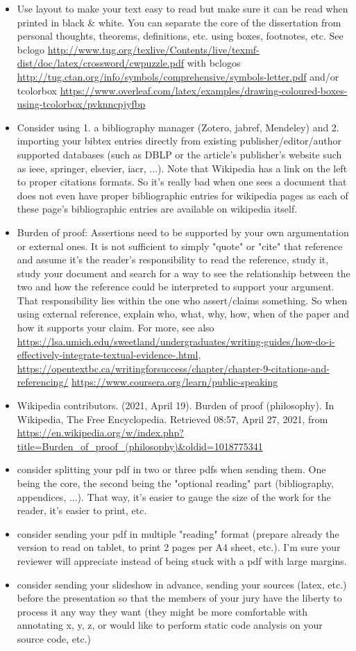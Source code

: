 \begin{itemize}
    \item Use layout to make your text easy to read but make sure it can be read when printed in black \& white. You can separate the core of the dissertation from personal thoughts, theorems, definitions, etc. using boxes, footnotes, etc. See bclogo \url{http://www.tug.org/texlive/Contents/live/texmf-dist/doc/latex/crossword/cwpuzzle.pdf} with bclogos \url{http://tug.ctan.org/info/symbols/comprehensive/symbols-letter.pdf} and/or tcolorbox \url{https://www.overleaf.com/latex/examples/drawing-coloured-boxes-using-tcolorbox/pvknncpjyfbp}
    \item Consider using 1. a bibliography manager (Zotero, jabref, Mendeley) and 2. importing your bibtex entries directly from existing publisher/editor/author supported databases (such as DBLP or the article's publisher's website such as ieee, springer, elsevier, iacr, ...). Note that Wikipedia has a link on the left to proper citations formats. So it's really bad when one sees a document that does not even have proper bibliographic entries for wikipedia pages as each of these page's bibliographic entries are available on wikipedia itself.
    \item Burden of proof: Assertions need to be supported by your own argumentation or external ones. It is not sufficient to simply "quote" or "cite" that reference and assume it's the reader's responsibility to read the reference, study it, study your document and search for a way to see the relationship between the two and how the reference could be interpreted to support your argument. That responsibility lies within the one who assert/claims something. So when using external reference, explain who, what, why, how, when of the paper and how it supports your claim. For more, see also \url{https://lsa.umich.edu/sweetland/undergraduates/writing-guides/how-do-i-effectively-integrate-textual-evidence-.html}, \url{https://opentextbc.ca/writingforsuccess/chapter/chapter-9-citations-and-referencing/} \url{https://www.coursera.org/learn/public-speaking}
    \item Wikipedia contributors. (2021, April 19). Burden of proof (philosophy). In Wikipedia, The Free Encyclopedia. Retrieved 08:57, April 27, 2021, from \url{https://en.wikipedia.org/w/index.php?title=Burden_of_proof_(philosophy)&oldid=1018775341}
    \item consider splitting your pdf in two or three pdfs when sending them. One being the core, the second being the "optional reading" part (bibliography, appendices, ...). That way, it's easier to gauge the size of the work for the reader, it's easier to print, etc.
    \item consider sending your pdf in multiple "reading" format (prepare already the version to read on tablet, to print 2 pages per A4 sheet, etc.). I'm sure your reviewer will appreciate instead of being stuck with a pdf with large margins.
    \item consider sending your slideshow in advance, sending your sources (latex, etc.) before the presentation so that the members of your jury have the liberty to process it any way they want (they might be more comfortable with annotating x, y, z, or would like to perform static code analysis on your source code, etc.)
\end{itemize}
